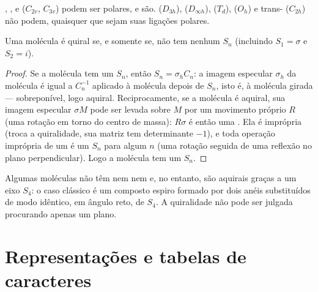 \begin{example}\label{ex:b3:point-groups:polar}
, ,  e  ($C_{2v}$, $C_{3v}$) podem ser polares, e
são.  ($D_{3h}$),  ($D_{\infty h}$),  ($T_d$),  ($O_h$)
e trans- ($C_{2h}$) não podem, quaisquer que sejam suas ligações polares.
\end{example}

\begin{theorem}\label{thm:b3:point-groups:chiral}
Uma molécula é quiral se, e somente se, não tem nenhum  $S_n$
(incluindo $S_1 = \sigma$ e $S_2 = i$).
\end{theorem}

\begin{proof}
Se a molécula tem um $S_n$, então $S_n = \sigma_hC_n$: a imagem especular $\sigma_h$
da molécula é igual a $C_n^{-1}$ aplicado à molécula depois de $S_n$, isto é,
à molécula girada --- sobreponível, logo aquiral. Reciprocamente, se a
molécula é aquiral, sua imagem especular $\sigma M$ pode ser levada sobre $M$ por um
movimento próprio $R$ (uma rotação em torno do centro de massa): $R\sigma$ é então uma
. Ela é imprópria (troca a quiralidade, sua matriz tem
determinante $-1$), e toda operação imprópria de um  é um
$S_n$ para algum $n$ (uma rotação seguida de uma reflexão no plano
perpendicular). Logo a molécula tem um $S_n$.
\end{proof}

\begin{example}\label{ex:b3:point-groups:s4}
Algumas moléculas não têm nem  nem  e, no
entanto, são aquirais graças a um eixo $S_4$: o caso clássico é um composto
espiro formado por dois anéis substituídos de modo idêntico, em ângulo reto,
de  $S_4$. A quiralidade não pode ser julgada procurando apenas um plano.
\end{example}

\section{Representações e tabelas de caracteres}

